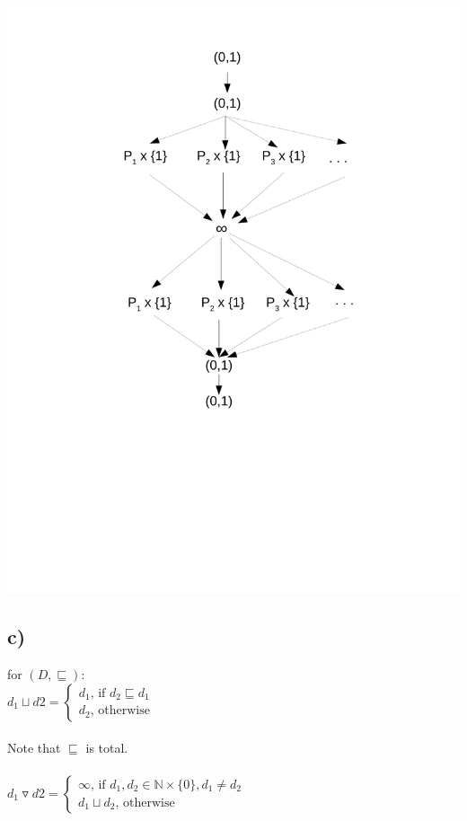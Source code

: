 \documentclass[fleqn,12pt]{article}
\begin{document}
\includegraphics[scale=.4]{Ex3b.pdf}
\subsection*{c)}
for $(D,\sqsubseteq)$:\\
$d_1 \sqcup d2 =
\begin{cases}
d_1 \text{, if } d_2 \sqsubseteq d_1 \\
d_2 \text{, otherwise}
\end{cases}$\\\\
Note that $\sqsubseteq$ is total.\\\\
$d_1 \triangledown d2 =
\begin{cases}
\infty \text{, if } d_1,d_2 \in \mathbb{N} \times \{0\}, d_1 \neq d_2 \\
d_1 \sqcup d_2 \text{, otherwise}
\end{cases}$\\\\
\end{document}
